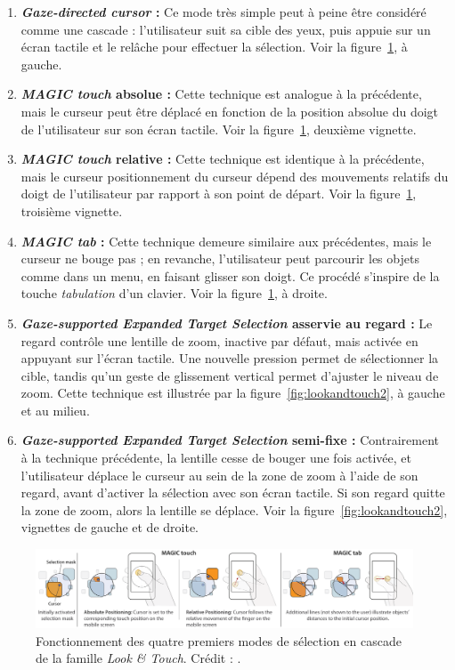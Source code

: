 	\begin{enumerate}
		\item \textbf{\emph{Gaze-directed cursor} :} Ce mode très simple peut à peine être considéré comme une cascade : l'utilisateur suit sa cible des yeux, puis appuie sur un écran tactile et le relâche pour effectuer la sélection. Voir la figure~\ref{fig:lookandtouch}, à gauche.
		\item \textbf{\emph{MAGIC touch} absolue :} Cette technique est analogue à la précédente, mais le curseur peut être déplacé en fonction de la position absolue du doigt de l'utilisateur sur son écran tactile. Voir la figure~\ref{fig:lookandtouch}, deuxième vignette.
		\item \textbf{\emph{MAGIC touch} relative :} Cette technique est identique à la précédente, mais le curseur positionnement du curseur dépend des mouvements relatifs du doigt de l'utilisateur par rapport à son point de départ. Voir la figure~\ref{fig:lookandtouch}, troisième vignette.
		\item \textbf{\emph{MAGIC tab} :} Cette technique demeure similaire aux précédentes, mais le curseur ne bouge pas ; en revanche, l'utilisateur peut parcourir les objets comme dans un menu, en faisant glisser son doigt. Ce procédé s'inspire de la touche \emph{tabulation} d'un clavier. Voir la figure~\ref{fig:lookandtouch}, à droite.
		\item \textbf{\emph{Gaze-supported Expanded Target Selection} asservie au regard :} Le regard contrôle une lentille de zoom, inactive par défaut, mais activée en appuyant sur l'écran tactile. Une nouvelle pression permet de sélectionner la cible, tandis qu'un geste de glissement vertical permet d'ajuster le niveau de zoom. Cette technique est illustrée par la figure~\ref{fig:lookandtouch2}, à gauche et au milieu.
		\item \textbf{\emph{Gaze-supported Expanded Target Selection} semi-fixe :} Contrairement à la technique précédente, la lentille cesse de bouger une fois activée, et l'utilisateur déplace le curseur au sein de la zone de zoom à l'aide de son regard, avant d'activer la sélection avec son écran tactile. Si son regard quitte la zone de zoom, alors la lentille se déplace. Voir la figure~\ref{fig:lookandtouch2}, vignettes de gauche et de droite.
	\end{enumerate}
	
	\begin{figure}[!htb]
		\centering
		\includegraphics[width=\textwidth]{figures/ch2/lookandtouch}
		\caption[\emph{Look \&{} Touch -- principe}]{Fonctionnement des quatre premiers modes de sélection en cascade de la famille \emph{Look \&{} Touch}. Crédit : \cite{stellmach2012look}.}
		\label{fig:lookandtouch}
	\end{figure}
	
